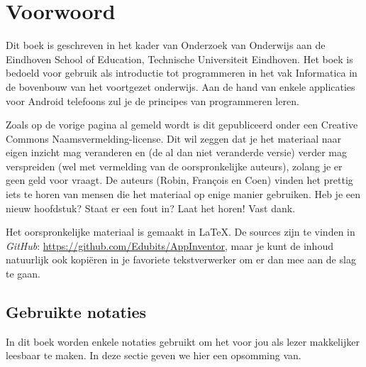 \chapter*{Voorwoord}

Dit boek is geschreven in het kader van Onderzoek van Onderwijs aan de Eindhoven School of Education, Technische Universiteit Eindhoven. Het boek is bedoeld voor gebruik als introductie tot programmeren in het vak Informatica in de bovenbouw van het voortgezet onderwijs. Aan de hand van enkele applicaties voor Android telefoons zul je de principes van programmeren leren.

Zoals op de vorige pagina al gemeld wordt is dit gepubliceerd onder een Creative Commons Naamsvermelding-license. Dit wil zeggen dat je het materiaal naar eigen inzicht mag veranderen en (de al dan niet veranderde versie) verder mag verspreiden (wel met vermelding van de oorspronkelijke auteurs), zolang je er geen geld voor vraagt. De auteurs (Robin, Fran\c{c}ois en Coen) vinden het prettig iets te horen van mensen die het materiaal op enige manier gebruiken. Heb je een nieuw hoofdstuk? Staat er een fout in? Laat het horen! Vast dank.  

Het oorspronkelijke materiaal is gemaakt in \LaTeX. De sources zijn te vinden in 
\emph{GitHub}: \url{https://github.com/Edubits/AppInventor}, maar je kunt de inhoud natuurlijk ook kopi\"eren in je favoriete tekstverwerker om er dan mee aan de slag te gaan. 



\section*{Gebruikte notaties}
In dit boek worden enkele notaties gebruikt om het voor jou als lezer makkelijker leesbaar te maken. In deze sectie geven we hier een opsomming van.

